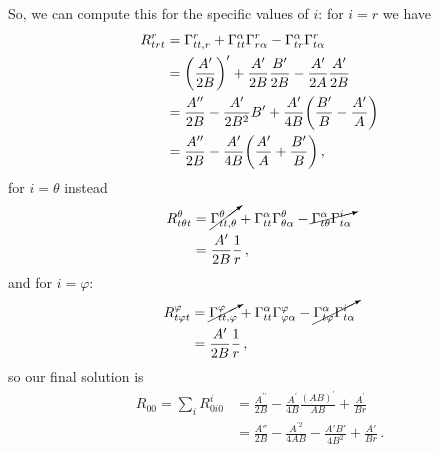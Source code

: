 \documentclass[main.tex]{subfiles}
\begin{document}
So, we can compute this for the specific values of \(i\): for \(i=r\) we have 
%
\begin{subequations}
\begin{align}
  R^{r}_{trt} &= \Gamma^{r}_{tt, r} + \Gamma^{\alpha}_{tt} 
  \Gamma^{r}_{r \alpha } - \Gamma^{\alpha }_{tr} \Gamma^{r}_{t \alpha }  \\
  &= \qty(\frac{A^{\prime }}{2B})^{\prime } + \frac{A^{\prime }}{2B} \frac{B^{\prime }}{2B} - \frac{A^{\prime }}{2A} \frac{A^{\prime }}{2B}  \\
  &= \frac{A^{\prime \prime}}{2B} - \frac{A^{\prime }}{2B^2} B^{\prime } + \frac{A^{\prime }}{4B} \qty(\frac{B^{\prime }}{B} - \frac{A^{\prime}}{A}) \\ 
  &= \frac{A^{\prime \prime}}{2B} - \frac{A^{\prime }}{4B} \qty(\frac{A^{\prime}}{A} + \frac{B^{\prime }}{B})
  \,,
\end{align}
\end{subequations}
%
for \(i= \theta \) instead 
%
\begin{subequations}
\begin{align}
  R^{\theta }_{t \theta  t} &= \cancelto{}{\Gamma^{\theta}_{tt, \theta}} + \Gamma^{\alpha}_{tt} 
  \Gamma^{\theta}_{\theta \alpha } - \cancelto{}{\Gamma^{\alpha }_{t\theta} \Gamma^{i}_{t \alpha }}  \\
  &= \frac{A^{\prime }}{2B} \frac{1}{r}
  \,,
\end{align}
\end{subequations}
%
and for \(i = \varphi \):  
%
\begin{subequations}
  \begin{align}
    R^{\varphi }_{t \varphi t} &= \cancelto{}{\Gamma^{\varphi}_{tt, \varphi}} + \Gamma^{\alpha}_{tt} 
    \Gamma^{\varphi}_{\varphi \alpha } - \cancelto{}{\Gamma^{\alpha }_{t\varphi} \Gamma^{i}_{t \alpha }}  \\
    &= \frac{A^{\prime }}{2B} \frac{1}{r}
    \,,
  \end{align}
\end{subequations}
%
so our final solution is 
%
\begin{subequations}
\begin{align}
  R_{00} = \sum_i R^{i}_{0i0} &= \frac{A^{\prime \prime}}{2B} 
  - \frac{A^{\prime }}{4B} \frac{(AB)^{\prime }}{AB} + \frac{A^{\prime }}{Br}  \\
  &= \frac{A''}{2B} - \frac{A^{\prime 2} }{4AB} - \frac{A' B' }{4B^2} + \frac{A'}{Br}
\,.
\end{align}
\end{subequations}
%
\end{document}

